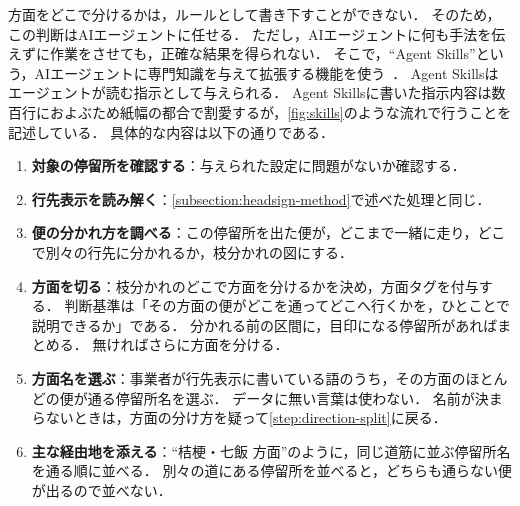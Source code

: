 方面をどこで分けるかは，ルールとして書き下すことができない．
そのため，この判断はAIエージェントに任せる．
ただし，AIエージェントに何も手法を伝えずに作業をさせても，正確な結果を得られない．
そこで，``Agent Skills''という，AIエージェントに専門知識を与えて拡張する機能を使う~\cite{AgentSkills}．
Agent Skillsはエージェントが読む指示として与えられる．
Agent Skillsに書いた指示内容は数百行におよぶため紙幅の都合で割愛するが，\cref{fig:skills}のような流れで行うことを記述している．
具体的な内容は以下の通りである．
\begin{enumerate}
    \item \textbf{対象の停留所を確認する}：与えられた設定に問題がないか確認する．
    \item \textbf{行先表示を読み解く}：\cref{subsection:headsign-method}で述べた処理と同じ．
    \item \textbf{便の分かれ方を調べる}：この停留所を出た便が，どこまで一緒に走り，どこで別々の行先に分かれるか，枝分かれの図にする．
    \item\label{step:direction-split} \textbf{方面を切る}：枝分かれのどこで方面を分けるかを決め，方面タグを付与する．
          判断基準は「その方面の便がどこを通ってどこへ行くかを，ひとことで説明できるか」である．
          分かれる前の区間に，目印になる停留所があればまとめる．
          無ければさらに方面を分ける．
    \item \textbf{方面名を選ぶ}：事業者が行先表示に書いている語のうち，その方面のほとんどの便が通る停留所名を選ぶ．
          データに無い言葉は使わない．
          名前が決まらないときは，方面の分け方を疑って\cref{step:direction-split}に戻る．
    \item \textbf{主な経由地を添える}：``桔梗・七飯 方面''のように，同じ道筋に並ぶ停留所名を通る順に並べる．
          別々の道にある停留所を並べると，どちらも通らない便が出るので並べない．
\end{enumerate}
